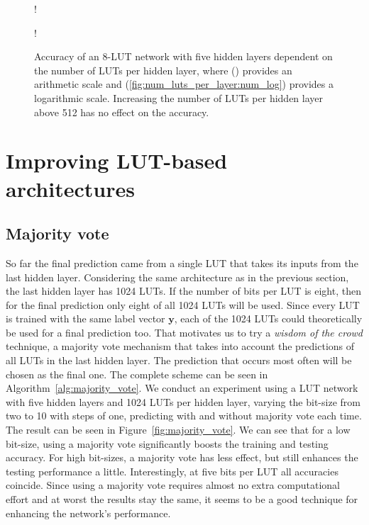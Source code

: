 \begin{figure}[!htb]
    \centering
  \begin{minipage}[b]{.45\linewidth}
     {!} {
    
    }
    \label{fig:num_luts_per_layer:num}
  \end{minipage}
  \begin{minipage}[b]{.45\linewidth}
     {!} {
    
    }
    \label{fig:num_luts_per_layer:num_log}
  \end{minipage}
  \caption{Accuracy of an 8-LUT network with five hidden layers dependent on the number of LUTs per hidden layer, where () provides an arithmetic scale and (\ref{fig:num_luts_per_layer:num_log}) provides a logarithmic scale. Increasing the number of LUTs per hidden layer above 512 has no effect on the accuracy.}
\label{fig:num_luts_per_layer}
\end{figure}
\FloatBarrier

\section{Improving LUT-based architectures}

\subsection{Majority vote} \label{sec:majority_vote}
So far the final prediction came from a single LUT that takes its inputs from the last hidden layer. Considering the same architecture as in the previous section, the last hidden layer has 1024 LUTs. If the number of bits per LUT is eight, then for the final prediction only eight of all 1024 LUTs will be used. Since every LUT is trained with the same label vector $\bm{y}$, each of the 1024 LUTs could theoretically be used for a final prediction too. That motivates us to try a \textit{wisdom of the crowd} technique, a majority vote mechanism that takes into account the predictions of all LUTs in the last hidden layer. The prediction that occurs most often will be chosen as the final one. The complete scheme can be seen in Algorithm~\ref{alg:majority_vote}. We conduct an experiment using a LUT network with five hidden layers and 1024 LUTs per hidden layer, varying the bit-size from two to 10 with steps of one, predicting with and without majority vote each time. The result can be seen in Figure~\ref{fig:majority_vote}. We can see that for a low bit-size, using a majority vote significantly boosts the training and testing accuracy. For high bit-sizes, a majority vote has less effect, but still enhances the testing performance a little. Interestingly, at five bits per LUT all accuracies coincide. Since using a majority vote requires almost no extra computational effort and at worst the results stay the same, it seems to be a good technique for enhancing the network's performance.


